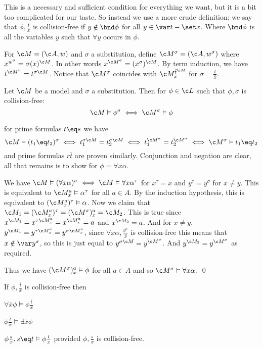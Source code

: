     This is a necessary and sufficient condition for everything we want, but it is a bit too complicated for our taste.
    So instead we use a more crude definition: we say that $\phi,\frac tx$ is {\emphcolor collision-free} if $y\notin\bnd\phi$ for all $y\in\var t-\set x$.
    Where $\bnd\phi$ is all the variables $y$ such that $\forall y$ occurs in $\phi$.

\edefn

For $\c M=(\c A,w)$ and $\sigma$ a substitution, define $\c M^\sigma=(\c A,w^\sigma)$ where $x^{w^\sigma}=\sigma(x)^{\c M}$.
In other words $x^{\c M^\sigma}=(x^\sigma)^{\c M}$.
By term induction, we have $t^{\c M^\sigma}=t^{\sigma\c M}$.
Notice that $\c M^\sigma$ coincides with $\c M^{\bar t^{\c M}}_{\bar x}$ for $\sigma=\frac{\bar t}{\bar x}$.

\blemm[title=The Substitution Lemma]

    Let $\c M$ be a model and $\sigma$ a substitution.
    Then for $\phi\in\c L$ such that $\phi,\sigma$ is collision-free:
    $$ \c M\vDash\phi^\sigma\iff\c M^\sigma\vDash\phi $$

\elemm

\Proof for prime formulas $t\eq s$ we have
$$ \c M\vDash(t_1\eq t_2)^\sigma \iff t_1^{\sigma\c M}=t_2^{\sigma\c M} \iff t_1^{\c M^\sigma} = t_2^{\c M^\sigma} \iff \c M^\sigma\vDash t_1\eq t_2 $$
and prime formulas $r\bar t$ are proven similarly.
Conjunction and negation are clear, all that remains is to show for $\phi=\forall x\alpha$.

We have $\c M\vDash(\forall x\alpha)^\sigma\iff\c M\vDash\forall x\alpha^\tau$ for $x^\tau=x$ and $y^\tau=y^\sigma$ for $x\neq y$.
This is equivalent to $\c M^a_x\vDash\alpha^\tau$ for all $a\in A$.
By the induction hypothesis, this is equivalent to $(\c M^a_x)^\tau\vDash\alpha$.
Now we claim that $\c M_1=(\c M^a_x)^\tau=(\c M^\sigma)^a_x=\c M_2$.
This is true since $x^{\c M_1}=x^{\tau\c M^a_x}=x^{\c M^a_x}=a$ and $x^{\c M_2}=a$.
And for $x\neq y$, $y^{\c M_1}=y^{\tau\c M^a_x}=y^{\sigma\c M^a_x}$, since $\forall x\alpha,\frac{y^\sigma}y$ is collision-free this means that $x\notin\var y^\sigma$, so this is just equal to
$y^{\sigma\c M}=y^{\c M^\sigma}$.
And $y^{\c M_2}=y^{\c M^\sigma}$ as required.

Thus we have $(\c M^\sigma)^a_x\vDash\phi$ for all $a\in A$ and so $\c M^\sigma\vDash\forall x\alpha$.
\qed

\bcoro

    If $\phi,\frac{\bar t}{\bar x}$ is collision-free then
    \benum
        \item $\forall\bar x\phi\vDash\phi\frac{\bar t}{\bar x}$
        \item $\phi\frac{\bar t}{\bar x}\vDash\exists\bar x\phi$
        \item $\phi\frac sx,s\eq t\vDash\phi\frac tx$ provided $\phi,\frac sx$ is collision-free.
    \eenum

